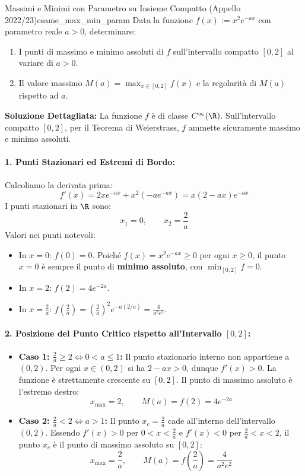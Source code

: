 \begin{esempio}{Massimi e Minimi con Parametro su Insieme Compatto (Appello 2022/23)}{esame_max_min_param}
Data la funzione $f(x) := x^2 e^{-ax}$ con parametro reale $a > 0$, determinare:
\begin{enumerate}[label=\alph*)]
    \item I punti di massimo e minimo assoluti di $f$ sull'intervallo compatto $[0, 2]$ al variare di $a > 0$.
    \item Il valore massimo $M(a) = \max_{x \in [0, 2]} f(x)$ e la regolarità di $M(a)$ rispetto ad $a$.
\end{enumerate}
\tcblower
\textbf{Soluzione Dettagliata:}
La funzione $f$ è di classe $C^\infty(\R)$. Sull'intervallo compatto $[0, 2]$, per il Teorema di Weierstrass, $f$ ammette sicuramente massimo e minimo assoluti.

\paragraph{1. Punti Stazionari ed Estremi di Bordo:}
Calcoliamo la derivata prima:
\[
    f'(x) = 2x e^{-ax} + x^2(-a e^{-ax}) = x(2 - ax)e^{-ax}
\]
I punti stazionari in $\R$ sono:
\[
    x_1 = 0, \qquad x_2 = \frac{2}{a}
\]
Valori nei punti notevoli:
\begin{itemize}
    \item In $x = 0$: $f(0) = 0$. Poiché $f(x) = x^2 e^{-ax} \ge 0$ per ogni $x \ge 0$, il punto $x = 0$ è sempre il punto di \textbf{minimo assoluto}, con $\min_{[0, 2]} f = 0$.
    \item In $x = 2$: $f(2) = 4 e^{-2a}$.
    \item In $x = \frac{2}{a}$: $f\left(\frac{2}{a}\right) = \left(\frac{2}{a}\right)^2 e^{-a(2/a)} = \frac{4}{a^2 e^2}$.
\end{itemize}

\paragraph{2. Posizione del Punto Critico rispetto all'Intervallo $[0, 2]$:}
\begin{itemize}
    \item \textbf{Caso 1: $\frac{2}{a} \ge 2 \iff 0 < a \le 1$:}
    Il punto stazionario interno non appartiene a $(0, 2)$. Per ogni $x \in (0, 2)$ si ha $2 - ax > 0$, dunque $f'(x) > 0$.
    La funzione è strettamente crescente su $[0, 2]$.
    Il punto di massimo assoluto è l'estremo destro:
    \[
        x_{\max} = 2, \qquad M(a) = f(2) = 4e^{-2a}
    \]
    \item \textbf{Caso 2: $\frac{2}{a} < 2 \iff a > 1$:}
    Il punto $x_c = \frac{2}{a}$ cade all'interno dell'intervallo $(0, 2)$.
    Essendo $f'(x) > 0$ per $0 < x < \frac{2}{a}$ e $f'(x) < 0$ per $\frac{2}{a} < x < 2$, il punto $x_c$ è il punto di massimo assoluto su $[0, 2]$:
    \[
        x_{\max} = \frac{2}{a}, \qquad M(a) = f\left(\frac{2}{a}\right) = \frac{4}{a^2 e^2}
    \]
\end{itemize}


\end{esempio}
